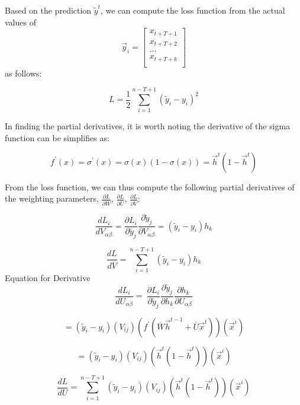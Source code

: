 \documentclass[
]{article}
\begin{document}
Based on the prediction \({\widetilde{y}}^{t}\), we can compute the loss
function from the actual values of\\

\[{\overrightarrow{y}}_{i} = \begin{bmatrix}
x_{t + T + 1} \\
x_{t + T + 2} \\
\ldots \\
x_{t + T + k} \\
\end{bmatrix}\] as follows:

\[L = \frac{1}{2}\sum_{i = 1}^{n - T + 1}\left( {\widetilde{y}}_{i} - y_{i} \right)^{2}\]

In finding the partial derivatives, it is worth noting the derivative of
the sigma function can be simplifies as:

\[f^{'}(x) = \sigma^{'}(x) = \sigma(x)\left( 1 - \sigma(x) \right) = {\overrightarrow{h}}^{t}\left( 1 - {\overrightarrow{h}}^{t} \right)\]

From the loss function, we can thus compute the following partial
derivatives of the weighting parameters,
\(\frac{\partial L}{\partial\overline{W}}\),
\(\frac{\partial L}{\partial\overline{U}}\),
\(\frac{\partial L}{\partial\overline{V}}\):

\[\frac{dL_{i}}{dV_{\alpha\beta}} = \frac{\partial L_{i}}{\partial{\widetilde{y}}_{j}}\frac{\partial{\widetilde{y}}_{j}}{\partial V_{\alpha\beta}} = \left( {\widetilde{y}}_{i} - y_{i} \right)h_{k}\]

\[\frac{dL}{d\overline{V}} = \sum_{i = 1}^{n - T + 1}{\left( {\widetilde{y}}_{i} - y_{i} \right)h_{k}}\]
Equation for Derivative
\[ \frac{dL_{i}}{dU_{\alpha\beta}} = \ \frac{\partial L_{i}}{\partial{\widetilde{y}}_{j}}\frac{\partial{\widetilde{y}}_{j}}{\partial h_{k}}\frac{\partial h_{k}}{\partial U_{\alpha\beta}} \]

\[= \left( {\widetilde{y}}_{i} - y_{i} \right)\left( V_{ij} \right)\left( f^{'}\left( \overline{W}{\overrightarrow{h}}^{t - 1} + \overline{U}{\overrightarrow{x}}^{t} \right) \right)\left( {\overrightarrow{x}}^{i} \right)\]

\[= \left( {\widetilde{y}}_{i} - y_{i} \right)\left( V_{ij} \right)\left( {\overrightarrow{h}}^{t}\left( 1 - {\overrightarrow{h}}^{t} \right) \right)\left( {\overrightarrow{x}}^{i} \right)\]

\[\frac{dL}{dU} = \sum_{i = 1}^{n - T + 1}{\left( {\widetilde{y}}_{i} - y_{i} \right)\left( V_{ij} \right)\left( {\overrightarrow{h}}^{t}\left( 1 - {\overrightarrow{h}}^{t} \right) \right)\left( {\overrightarrow{x}}^{i} \right)}\]
\end{document}
